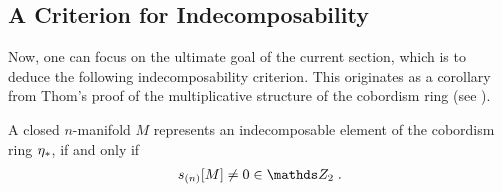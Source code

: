 \subsection{A Criterion for Indecomposability}
\label{sec:indecomposabilitycriterion}
Now, one can focus on the ultimate goal of the current section, which
is to deduce the following indecomposability criterion. This
originates as a corollary from Thom's proof of the multiplicative
structure of the cobordism ring (see \cite[Section~IV.5]{thom}).
\begin{Thm}\label{thm:indecomposabilitycriterion}
  A closed $n$-manifold $M$ represents an indecomposable element of
  the cobordism ring $\eta_*$, if and only if
  \begin{gather*}
    \snum{(n)}{M} \neq 0 \in \Zmod2
    \;.
  \end{gather*}
\end{Thm}

